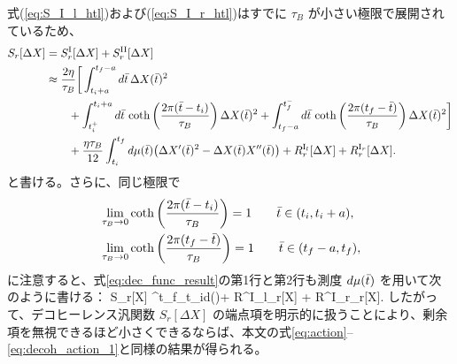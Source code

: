 式(\ref{eq:S_I_l_htl})および(\ref{eq:S_I_r_htl})はすでに $\tau_B$ が小さい極限で展開されているため、
\begin{align}\label{eq:dec_func_result}
	S_r[\Delta X] &= S^{\rm I}_r[\Delta X] + S^{\rm II}_r[\Delta X] \nonumber\\
	      &\approx \frac{2\eta}{\tau_B}\bigg[\int^{t_f-a}_{t_i+a}d\bar{t}\,\Delta X(\bar{t})^2  \nonumber \\
	      &\qquad + \int^{t_i+a}_{t^+_i}d\bar{t}\,\coth\left(\frac{2\pi(\bar{t}-t_i)}{\tau_B}\right)\Delta X(\bar{t})^2 + \int^{t^-_f}_{t_f-a}d\bar{t}\,\coth\left(\frac{2\pi(t_f-\bar{t})}{\tau_B}\right)\Delta X(\bar{t})^2\bigg] \nonumber\\
	      &\qquad + \frac{\eta\tau_B}{12}\int^{t_f}_{t_i}d\mu(\bar{t})\big(\Delta X'(\bar{t})^2 - \Delta X(\bar{t})X''(\bar{t})\big) + R^{{\rm I}_l}_r[\Delta X] + R^{{\rm I}_r}_r[\Delta X].
\end{align}
と書ける。さらに、同じ極限で
\begin{align*}
    &\lim_{\tau_B\rightarrow0}\coth\left(\frac{2\pi(\bar{t}-t_i)}{\tau_B}\right) = 1 \qquad \bar{t}\in(t_i,t_i+a), \\
    &\lim_{\tau_B\rightarrow0}\coth\left(\frac{2\pi(t_f-\bar{t})}{\tau_B}\right) = 1 \qquad \bar{t}\in(t_f-a,t_f),
\end{align*}
に注意すると、式\eqref{eq:dec_func_result}の第1行と第2行も測度 $d\mu(\bar{t})$ を用いて次のように書ける：
\be
    S_r[\Delta X] \approx \int^{t_f}_{t_i}d\mu(\tb) + R^{{\rm I}_l}_r[\Delta X] + R^{{\rm I}_r}_r[\Delta X].
\ee
したがって、デコヒーレンス汎関数 $S_r[\Delta X]$ の端点項を明示的に扱うことにより、剰余項を無視できるほど小さくできるならば、本文の式\eqref{eq:action}--\eqref{eq:decoh_action_1}と同様の結果が得られる。
